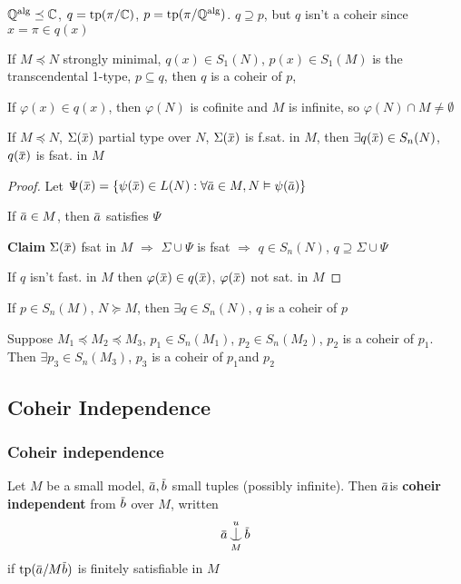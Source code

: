\documentclass[11pt]{article}
\begin{document}
\begin{examplle}[]
\(\mathbb{Q}^{\operatorname{\text{alg}}}\preceq\mathbb{C}\), \(q=\operatorname{tp}(\pi/\mathbb{C})\), \(p=\operatorname{tp}(\pi/\mathbb{Q}^{\operatorname{\text{alg}}})\). \(q\supseteq p\), but \(q\) isn't a coheir
since \(x=\pi\in q(x)\)
\end{examplle}

\begin{examplle}[]
If \(M\preceq N\) strongly minimal, \(q(x)\in S_1(N)\), \(p(x)\in S_1(M)\) is the transcendental
1-type, \(p\subseteq q\), then \(q\) is a coheir of \(p\),

If \(\varphi(x)\in q(x)\), then \(\varphi(N)\) is cofinite and \(M\) is infinite, so \(\varphi(N)\cap M\neq\emptyset\)
\end{examplle}

\begin{lemma}[]
\label{3.10.4}
If \(M\preceq N\), \(\Sigma(\barx)\) partial type over \(N\), \(\Sigma(\barx)\) is f.sat. in \(M\),
then \(\exists q(\barx)\in S_n(N)\), \(q(\barx)\) is fsat. in \(M\)
\end{lemma}

\begin{proof}
Let \(\Psi(\barx)=\{\psi(\barx)\in L(N):\forall\bara\in M, N\vDash\psi(\bara)\}\)

If \(\bara\in M\), then \(\bara\) satisfies \(\Psi\)

\textbf{Claim} \(\Sigma(\barx)\) fsat in \(M\) \(\Rightarrow\) \(\Sigma\cup\Psi\) is fsat \(\Rightarrow\) \(q\in S_n(N)\), \(q\supseteq\Sigma\cup\Psi\)

If \(q\) isn't fast. in \(M\) then \(\varphi(\barx)\in q(\barx)\), \(\varphi(\barx)\) not sat. in \(M\)
\end{proof}

\begin{theorem}[]
If \(p\in S_n(M)\), \(N\succeq M\), then \(\exists q\in S_n(N)\), \(q\) is a coheir of \(p\)
\end{theorem}

\begin{theorem}[]
Suppose \(M_1\preceq M_2\preceq M_3\), \(p_1\in S_n(M_1)\), \(p_2\in S_n(M_2)\), \(p_2\) is a coheir of \(p_1\).
Then \(\exists p_3\in S_n(M_3)\), \(p_3\) is a coheir of \(p_1\)and \(p_2\)
\end{theorem}
\subsection{Coheir Independence}
\label{sec:orgd561d22}
\subsubsection{Coheir independence}
\label{sec:org37b724b}
\begin{definition}[]
Let \(M\) be a small model, \(\bara,\barb\) small tuples (possibly infinite). Then \(\bara\)is
\textbf{coheir independent} from \(\barb\) over \(M\), written
\begin{equation*}
\bara\ind_M^u\barb
\end{equation*}
if \(\tp(\bara/M\barb)\) is finitely satisfiable in \(M\)
\end{definition}
\end{document}
